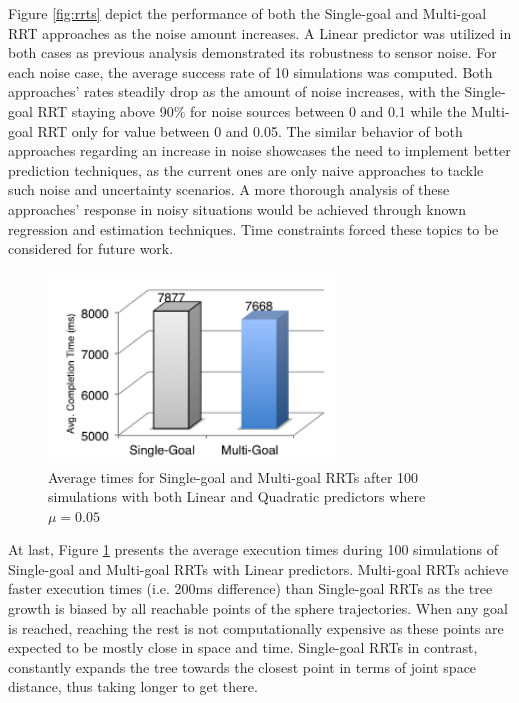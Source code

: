 \documentclass[letterpaper, 10 pt, conference]{ieeeconf}  %
\begin{document}
Figure \ref{fig:rrts} depict the performance of both the Single-goal and
Multi-goal RRT approaches as the noise amount increases. A Linear
predictor was utilized in both cases as previous analysis demonstrated
its robustness to sensor noise. For each noise case, the average success
rate of 10 simulations was computed. Both approaches’ rates steadily
drop as the amount of noise increases, with the Single-goal RRT staying
above 90\% for noise sources between 0 and 0.1 while the Multi-goal RRT
only for value between 0 and 0.05. The similar behavior of both
approaches regarding an increase in noise showcases the need to
implement better prediction techniques, as the current ones are only
naive approaches to tackle such noise and uncertainty scenarios. A more
thorough analysis of these approaches’ response in noisy situations
would be achieved through known regression and estimation techniques.
Time constraints forced these topics to be considered for future work.

\begin{figure}
        \centering
        \includegraphics[width=3in]{fig/runtimes}
        \caption{Average times for Single-goal and
        Multi-goal RRTs after 100 simulations with both Linear and
      Quadratic predictors where $\mu = 0.05$}\label{fig:runtimes}
\end{figure}

At last, Figure \ref{fig:runtimes} presents the average execution times
during 100 simulations of Single-goal and Multi-goal RRTs with Linear
predictors. Multi-goal RRTs achieve faster execution times (i.e. 200ms
difference) than Single-goal RRTs as the tree growth is biased by all
reachable points of the sphere trajectories. When any goal is reached,
reaching the rest is not computationally expensive as these points are
expected to be mostly close in space and time. Single-goal RRTs in
contrast, constantly expands the tree towards the closest point in terms
of joint space distance, thus taking longer to get there.
\end{document}
